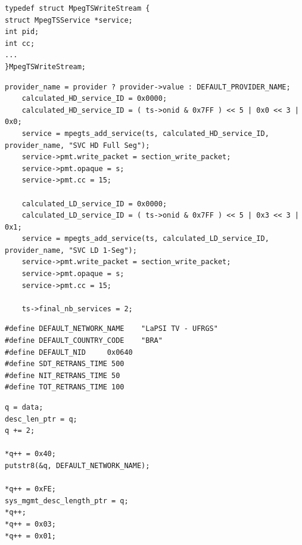 \documentclass[
	12pt,				%
	openright,			%
	twoside,			%
	a4paper,			%
	brazil,
	french,				%
	english
	]{abntex2}
\begin{document}
\begin{apendicesenv}
\begin{minipage}{\linewidth}
\begin{lstlisting}[caption={Excerpt of MpegTSWriteStream structure}, label=lst_MpegTSWriteStream]
typedef struct MpegTSWriteStream {
struct MpegTSService *service;
int pid;
int cc;
...
}MpegTSWriteStream;
\end{lstlisting}
\end{minipage}

\begin{minipage}{\linewidth}
\begin{lstlisting}[caption={Excerpt of multiple services creation algorithm.}, label={}]
    provider_name = provider ? provider->value : DEFAULT_PROVIDER_NAME;
	calculated_HD_service_ID = 0x0000;
	calculated_HD_service_ID = ( ts->onid & 0x7FF ) << 5 | 0x0 << 3 | 0x0;
	service = mpegts_add_service(ts, calculated_HD_service_ID, provider_name, "SVC HD Full Seg");
	service->pmt.write_packet = section_write_packet;
	service->pmt.opaque = s;
	service->pmt.cc = 15;

	calculated_LD_service_ID = 0x0000;
	calculated_LD_service_ID = ( ts->onid & 0x7FF ) << 5 | 0x3 << 3 | 0x1;
	service = mpegts_add_service(ts, calculated_LD_service_ID, provider_name, "SVC LD 1-Seg");
	service->pmt.write_packet = section_write_packet;
	service->pmt.opaque = s;
	service->pmt.cc = 15;
	
	ts->final_nb_services = 2;
\end{lstlisting}
\end{minipage}

\begin{minipage}{\linewidth}
\begin{lstlisting}[caption={Created macros.}, label={lst_macros}]
#define DEFAULT_NETWORK_NAME    "LaPSI TV - UFRGS"
#define DEFAULT_COUNTRY_CODE    "BRA"
#define DEFAULT_NID		0x0640
#define SDT_RETRANS_TIME 500
#define NIT_RETRANS_TIME 50
#define TOT_RETRANS_TIME 100
\end{lstlisting}
\end{minipage}

\begin{minipage}{\linewidth}
\begin{lstlisting}[caption={Pointer assignment algorithm.}, label={lst_pointer_assignment}]
q = data;
desc_len_ptr = q;
q += 2;

*q++ = 0x40;
putstr8(&q, DEFAULT_NETWORK_NAME);

*q++ = 0xFE;
sys_mgmt_desc_length_ptr = q;
*q++;
*q++ = 0x03;
*q++ = 0x01;
\end{lstlisting}
\end{minipage}


\end{apendicesenv}
\end{document}
